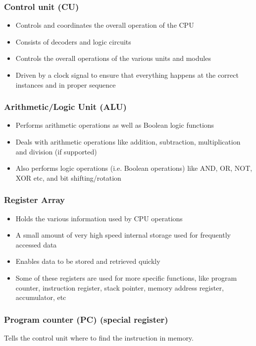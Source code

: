 \documentclass[11pt]{article}
\begin{document}
\subsubsection{Control unit (CU)}
\label{sec:org3539b82}
\begin{itemize}
\item Controls and coordinates the overall operation of the CPU
\item Consists of decoders and logic circuits
\item Controls the overall operations of the various units and modules
\item Driven by a clock signal to ensure that everything happens at the correct instances and in proper sequence
\end{itemize}

\subsubsection{Arithmetic/Logic Unit (ALU)}
\label{sec:org1b21246}
\begin{itemize}
\item Performs arithmetic operations as well as Boolean logic functions
\item Deals with arithmetic operations like addition, subtraction, multiplication and division (if supported)
\item Also performs logic operations (i.e. Boolean operations) like AND, OR, NOT, XOR etc, and bit shifting/rotation
\end{itemize}

\subsubsection{Register Array}
\label{sec:orgcc94f1f}
\begin{itemize}
\item Holds the various information used by CPU operations
\item A small amount of very high speed internal storage used for frequently accessed data
\item Enables data to be stored and retrieved quickly
\item Some of these registers are used for more specific functions, like program counter, instruction register, stack pointer, memory address register, accumulator, etc
\end{itemize}

\subsubsection{Program counter (PC) (special register)}
\label{sec:org648ec9b}
Tells the control unit where to find the instruction in memory.
\end{document}
